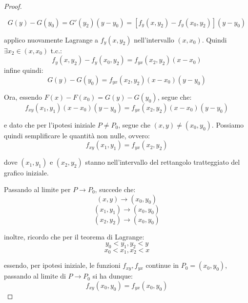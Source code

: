 \begin{proof}
\begin{itemize}
              \[
                  G(y) -G(y_0) = G'(y_2) (y-y_0) = [f_y(x,y_2) - f_y(x_0,y_2)] (y-y_0)
              \]

              applico nuovamente Lagrange a \(f_y(x,y_2)\) nell'intervallo \((x,x_0)\). Quindi \(\exists x_2 \in (x,x_0)\) t.c.:
              \[
                  f_y(x,y_2) - f_y(x_0,y_2) = f_{yx}(x_2,y_2)(x-x_0)
              \]
              infine quindi:
              \[
                  G(y) -G(y_0) = f_{yx}(x_2,y_2)(x-x_0)(y-y_0)
              \]
    \end{itemize}
    Ora, essendo \(F(x) - F(x_0) = G(y) - G(y_0)\), segue che:
    \[
        f_{xy}(x_1,y_1)(x-x_0)(y-y_0) = f_{yx}(x_2,y_2)(x-x_0)(y-y_0)
    \]

    e dato che per l'ipotesi iniziale \(P \neq P_0\), segue che \((x,y) \neq (x_0,y_0)\). Possiamo quindi semplificare le quantità non nulle, ovvero:
    \[
        f_{xy}(x_1,y_1) = f_{yx}(x_2,y_2)
    \]

    dove \((x_1,y_1)\) e \((x_2,y_2)\) stanno nell'intervallo del rettangolo tratteggiato del grafico iniziale.

    \filbreak{}
    Passando al limite per \(P \rightarrow P_0\), succede che:
    \[
        (x,y) \rightarrow (x_0,y_0)
    \]
    \[
        (x_1,y_1) \rightarrow (x_0,y_0)
    \]
    \[
        (x_2,y_2) \rightarrow (x_0,y_0)
    \]

    inoltre, ricordo che per il teorema di Lagrange:
    \[y_0 < y_1, y_2 < y\]
    \[x_0 < x_1, x_2 < x\]

    essendo, per ipotesi iniziale, le funzioni \(f_{xy},f_{yx}\) continue in \(P_0=(x_0,y_0)\), passando al limite di \(P \rightarrow P_0\) si ha dunque:
    \[
        f_{xy}(x_0,y_0) = f_{yx}(x_0,y_0)
    \]
\end{proof}

